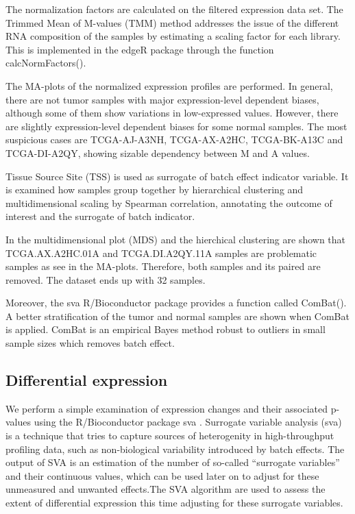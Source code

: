 \documentclass[9pt,twocolumn,twoside]{gsajnl}
\begin{document}
The normalization factors are calculated on the filtered expression data set. The Trimmed Mean of M-values (TMM) method addresses the issue of the different RNA composition of the samples by estimating a scaling factor for each library. This is implemented in the edgeR package \citep{Robinson2010b} through the function calcNormFactors().

The MA-plots of the normalized expression profiles are performed. In general, there are not tumor samples with major expression-level dependent biases, although some of them show variations in low-expressed values. However, there are slightly expression-level dependent biases for some normal samples. The most suspicious cases are TCGA-AJ-A3NH, TCGA-AX-A2HC, TCGA-BK-A13C and TCGA-DI-A2QY, showing sizable dependency between M and A values. 

Tissue Source Site (TSS) is used as surrogate of batch effect indicator variable. It is examined how samples group together by hierarchical clustering and multidimensional scaling by Spearman correlation, annotating the outcome of interest and the surrogate of batch indicator.

In the multidimensional plot (MDS) and the hierchical clustering are shown that TCGA.AX.A2HC.01A and TCGA.DI.A2QY.11A samples are problematic samples as see in the MA-plots. Therefore, both samples and its paired are removed. The dataset ends up with 32 samples.

Moreover, the sva \citep{sva} R/Bioconductor package provides a function called ComBat(). A better stratification of the tumor and normal samples are shown when ComBat is applied. ComBat is an empirical Bayes method robust to outliers in small sample sizes which removes batch effect. 


\subsection*{Differential expression}
We perform a simple examination of expression changes and their associated p-values using the R/Bioconductor package sva \citep{sva}. Surrogate variable analysis (sva) is a technique that tries to capture sources of heterogenity in high-throughput profiling data, such as non-biological variability introduced by batch effects. The output of SVA is an estimation of the number of so-called “surrogate variables” and their continuous values, which can be used later on to adjust for these unmeasured and unwanted effects.The SVA algorithm are used to assess the extent of differential expression this time adjusting for these surrogate variables. 
\end{document}
